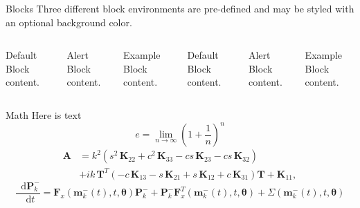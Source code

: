 \documentclass[10pt]{beamer} %
\newcommand{\matr}[1]{\mathbf{#1}} %
\newcommand{\vect}[1]{\mathbf{#1}} %
\DeclareRobustCommand*{\drv}{\mathop{}\!\mathrm{d}}
\begin{document}
\begin{frame}{Blocks}
  Three different block environments are pre-defined and may be styled with an
  optional background color.

  \begin{columns}[T,onlytextwidth]
      \begin{block}{Default}
        Block content.
      \end{block}

      \begin{alertblock}{Alert}
        Block content.
      \end{alertblock}

      \begin{exampleblock}{Example}
        Block content.
      \end{exampleblock}



      \begin{block}{Default}
        Block content.
      \end{block}

      \begin{alertblock}{Alert}
        Block content.
      \end{alertblock}

      \begin{exampleblock}{Example}
        Block content.
      \end{exampleblock}

  \end{columns}
\end{frame}
\begin{frame}{Math}
Here is text \cite{knuth92}
  \begin{equation*}
    e = \lim_{n\to \infty} \left(1 + \frac{1}{n}\right)^n
  \end{equation*}
  \begin{equation*}
 	 \begin{aligned}
  		\matr{A} & =  k^2\left(s^2 \,\matr{K}_{22} + c^2\, \matr{K}_{33} - c s\, \matr{K}_{23} - c s\, \matr{K}_{32}\right) \\
  		& + i k\, \matr{T}^T\left(-c\, \matr{K}_{13} - s\, \matr{K}_{21} + s\, \matr{K}_{12} + c\, \matr{K}_{31}\right) \matr{T} +\matr{K}_{11},
  	\end{aligned}
  \end{equation*}
 \begin{equation}
  \frac{\drv\vect{P}_k^-}{\drv t}=\vect{F}_x(\vect{m}_k^-(t),t,\vect{\theta})\vect{P}_k^- +\vect{P}_k^- \vect{F}_x^T(\vect{m}_k^-(t),t,\vect{\theta}) + \Sigma(\vect{m}_k^-(t),t,\vect{\theta})
 \label{eq:Euler}
\end{equation}
\end{frame}
\end{document}
